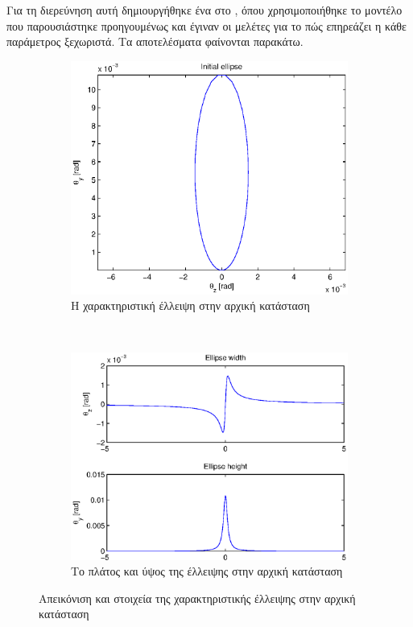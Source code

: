 Για τη διερεύνηση αυτή δημιουργήθηκε ένα  στο , όπου χρησιμοποιήθηκε το μοντέλο που παρουσιάστηκε προηγουμένως και έγιναν οι μελέτες για το πώς επηρεάζει η κάθε παράμετρος ξεχωριστά. 
Τα αποτελέσματα φαίνονται παρακάτω.

\begin{figure}[tph]	
	\begin{subfigure}{0.45\textwidth}
		\includegraphics[width=0.9\linewidth]{figures/beam-deflection-script-01-initial-elipse}
		\centering
		\caption{Η χαρακτηριστική έλλειψη στην αρχική κατάσταση}
		\label{fig:beam-deflection-script-01-initial-elipse}
	\end{subfigure}
	~
	\begin{subfigure}{0.45\textwidth}
		\includegraphics[width=0.9\linewidth]{figures/beam-deflection-script-02-elipse-width}
		\centering
		\caption{Το πλάτος και ύψος της έλλειψης στην αρχική κατάσταση}
		\label{fig:beam-deflection-script-02-elipse-width}
	\end{subfigure}
\caption{Απεικόνιση και στοιχεία της χαρακτηριστικής έλλειψης στην αρχική κατάσταση}
\label{fig:initial-ellipse}
\end{figure}

